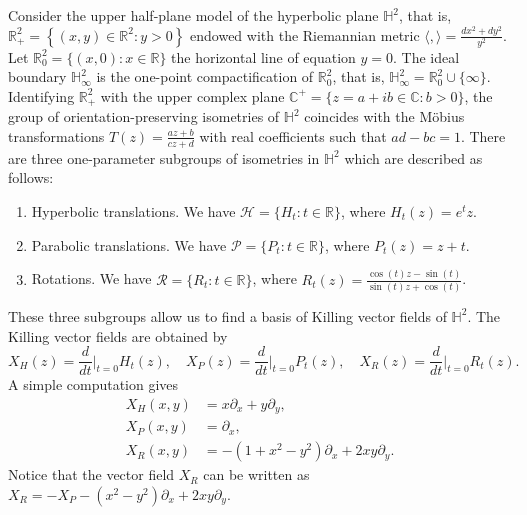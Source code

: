 \documentclass[12pt]{amsart}
\theoremstyle{plain}
\theoremstyle{definition}
\def\h{\mathbb H}
\def\r{\mathbb R}
\def\c{\mathbb C}
\begin{document}
Consider the upper half-plane model of the hyperbolic plane $\h^2$, that is,   $\r^2_+= \left\{ (x,y) \in \r^2\colon y > 0\right\}$ endowed with the   Riemannian metric $\langle,\rangle = \frac{dx^2 + dy^2}{y^2}$. Let $\r^2_0=\{(x,0)\colon x\in\r\}$ the horizontal line of equation $y=0$. The ideal boundary  $\h^2_\infty$ is the one-point compactification of $\r^2_0$, that is,  $\h^2_\infty=\r^2_0\cup\{\infty\}$. Identifying $\r^2_+$ with the upper complex plane $\c^+=\{z=a+ib\in\c\colon b>0\}$, the group of orientation-preserving isometries of $\h^2$   coincides with the M\"obius transformations $T(z) = \frac{az+b}{cz+d}$ with real coefficients such that $ad-bc=1$.   There are three one-parameter subgroups of isometries in $\h^2$ which are described as follows:
\begin{enumerate}
\item Hyperbolic translations. We have $\mathcal{H}=\{H_t\colon t\in\r\}$, where $H_t(z) = e^{t}z$.
\item Parabolic translations. We have $\mathcal{P}=\{P_t\colon t\in\r\}$, where $P_t(z) = z + t$.
\item  Rotations. We have $\mathcal{R}=\{ R_t\colon t\in\r\}$, where $R_t(z) =    \frac{\cos(t)z - \sin(t)}{\sin(t)z +\cos(t)}$.
\end{enumerate}

These three subgroups allow us to find a basis of Killing vector fields of $\h^2$. The Killing vector fields are obtained by 
$$
X_H(z)=\frac{d}{dt}{\Big|}_{t=0}H_t(z),\quad X_P(z)=\frac{d}{dt}{\Big|}_{t=0}P_t(z),\quad X_R(z)=\frac{d}{dt}{\Big|}_{t=0}R_t(z).
$$
A simple computation gives 
\begin{equation}\label{kv}
\begin{split}
X_H(x,y)&=x\partial_x+y\partial_y,\\
 X_P(x,y)&=\partial_x,\\
 X_R(x,y)&=-(1+x^2-y^2)\partial_x+2xy\partial_y.
 \end{split}
\end{equation}
Notice that the vector field $X_R$ can be written as $X_R=-X_P-(x^2-y^2)\partial_x+2xy\partial_y$.  
\end{document}
